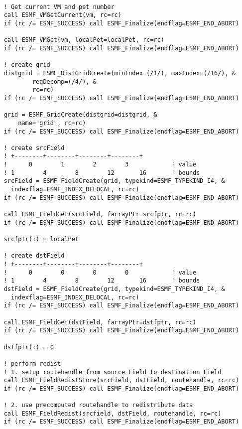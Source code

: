  \begin{verbatim}

    ! Get current VM and pet number
    call ESMF_VMGetCurrent(vm, rc=rc)
    if (rc /= ESMF_SUCCESS) call ESMF_Finalize(endflag=ESMF_END_ABORT)

    call ESMF_VMGet(vm, localPet=localPet, rc=rc)
    if (rc /= ESMF_SUCCESS) call ESMF_Finalize(endflag=ESMF_END_ABORT)

    ! create grid
    distgrid = ESMF_DistGridCreate(minIndex=(/1/), maxIndex=(/16/), &
            regDecomp=(/4/), &
            rc=rc)
    if (rc /= ESMF_SUCCESS) call ESMF_Finalize(endflag=ESMF_END_ABORT)

    grid = ESMF_GridCreate(distgrid=distgrid, &
        name="grid", rc=rc)
    if (rc /= ESMF_SUCCESS) call ESMF_Finalize(endflag=ESMF_END_ABORT)

    ! create srcField
    ! +--------+--------+--------+--------+
    !      0        1        2        3            ! value
    ! 1        4        8        12       16       ! bounds
    srcField = ESMF_FieldCreate(grid, typekind=ESMF_TYPEKIND_I4, &
      indexflag=ESMF_INDEX_DELOCAL, rc=rc)
    if (rc /= ESMF_SUCCESS) call ESMF_Finalize(endflag=ESMF_END_ABORT)

    call ESMF_FieldGet(srcField, farrayPtr=srcfptr, rc=rc)
    if (rc /= ESMF_SUCCESS) call ESMF_Finalize(endflag=ESMF_END_ABORT)

    srcfptr(:) = localPet

    ! create dstField
    ! +--------+--------+--------+--------+
    !      0        0        0        0            ! value
    ! 1        4        8        12       16       ! bounds
    dstField = ESMF_FieldCreate(grid, typekind=ESMF_TYPEKIND_I4, &
      indexflag=ESMF_INDEX_DELOCAL, rc=rc)
    if (rc /= ESMF_SUCCESS) call ESMF_Finalize(endflag=ESMF_END_ABORT)

    call ESMF_FieldGet(dstField, farrayPtr=dstfptr, rc=rc)
    if (rc /= ESMF_SUCCESS) call ESMF_Finalize(endflag=ESMF_END_ABORT)
  
    dstfptr(:) = 0

    ! perform redist
    ! 1. setup routehandle from source Field to destination Field
    call ESMF_FieldRedistStore(srcField, dstField, routehandle, rc=rc)
    if (rc /= ESMF_SUCCESS) call ESMF_Finalize(endflag=ESMF_END_ABORT)

    ! 2. use precomputed routehandle to redistribute data
    call ESMF_FieldRedist(srcfield, dstField, routehandle, rc=rc)
    if (rc /= ESMF_SUCCESS) call ESMF_Finalize(endflag=ESMF_END_ABORT)


\end{verbatim}
